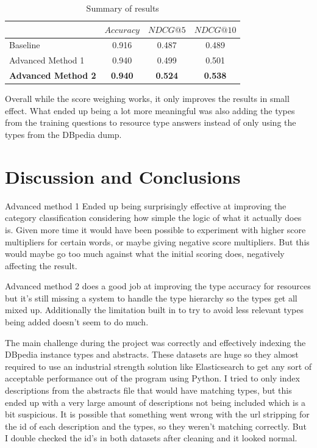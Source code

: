 \documentclass[sigconf]{acmart}
\begin{document}
\begin{table}[h]
\begin{center}
\caption{Summary of results}
\begin{tabular}{l|c|c|c}
     & $Accuracy$ & $NDCG@5$ & $NDCG@10$ \\
    \hline
    Baseline & 0.916 &  0.487 & 0.489 \\
    Advanced Method 1 & 0.940 & 0.499 &  0.501 \\
    \textbf{Advanced Method 2} & \textbf{0.940} & \textbf{0.524} &  \textbf{0.538} \\
\end{tabular}
\label{tab:sum_res}
\end{center}
\end{table}

Overall while the score weighing works, it only improves the results in small effect. What ended up being a lot more meaningful was also adding the types from the training questions to resource type answers instead of only using the types from the DBpedia dump.


\section{Discussion and Conclusions}
Advanced method 1 Ended up being surprisingly effective at improving the category classification considering how simple the logic of what it actually does is. Given more time it would have been possible to experiment with higher score multipliers for certain words, or maybe giving negative score multipliers. But this would maybe go too much against what the initial scoring does, negatively affecting the result. 

Advanced method 2 does a good job at improving the type accuracy for resources but it's still missing a system to handle the type hierarchy so the types get all mixed up. Additionally the limitation built in to try to avoid less relevant types being added doesn't seem to do much. 

The main challenge during the project was correctly and effectively indexing the DBpedia instance types and abstracts. These datasets are huge so they almost required to use an industrial strength solution like Elasticsearch to get any sort of acceptable performance out of the program using Python. I tried to only index descriptions from the abstracts file that would have matching types, but this ended up with a very large amount of descriptions not being included which is a bit suspicious. It is possible that something went wrong with the url stripping for the id of each description and the types, so they weren't matching correctly. But I double checked the id's in both datasets after cleaning and it looked normal. 
\end{document}
